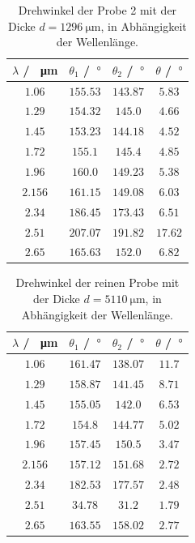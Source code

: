 \begin{table}
  \centering
  \begin{tabular}{c c c c}
    \toprule
    $\lambda$ / \SI{}{\micro\meter}&$\theta_1$ / $\SI{}{\degree}$&$\theta_2$ / $\SI{}{\degree}$&$\theta$ / $\SI{}{\degree}$ \\
    \midrule
    $\num{1.06} $&$\num{155.53}$&$\num{143.87}$&$\num{5.83}$\\
    $\num{1.29} $&$\num{154.32}$&$\num{145.0}$&$\num{4.66}$\\
    $\num{1.45} $&$\num{153.23}$&$\num{144.18}$&$\num{4.52}$\\
    $\num{1.72} $&$\num{155.1}$&$\num{145.4}$&$\num{4.85}$\\
    $\num{1.96} $&$\num{160.0}$&$\num{149.23}$&$\num{5.38}$\\
    $\num{2.156}$&$\num{161.15}$&$\num{149.08}$&$\num{6.03}$\\
    $\num{2.34} $&$\num{186.45}$&$\num{173.43}$&$\num{6.51}$\\
    $\num{2.51} $&$\num{207.07}$&$\num{191.82}$&$\num{17.62}$\\
    $\num{2.65} $&$\num{165.63}$&$\num{152.0}$&$\num{6.82}$\\
    \bottomrule
  \end{tabular}
  \caption{Drehwinkel der Probe 2 mit der Dicke $d=\SI{1296}{\micro\meter}$, in Abhängigkeit der Wellenlänge.}
  \label{tab:Drehwinkel_2}
\end{table}

\begin{table}
  \centering
  \begin{tabular}{c c c c}
    \toprule
    $\lambda$ / \SI{}{\micro\meter}&$\theta_1$ / $\SI{}{\degree}$&$\theta_2$ / $\SI{}{\degree}$&$\theta$ / $\SI{}{\degree}$ \\
    \midrule
    $\num{1.06} $&$\num{161.47}$&$\num{138.07}$&$\num{11.7}$\\
    $\num{1.29} $&$\num{158.87}$&$\num{141.45}$&$\num{8.71}$\\
    $\num{1.45} $&$\num{155.05}$&$\num{142.0}$&$\num{6.53}$\\
    $\num{1.72} $&$\num{154.8}$&$\num{144.77}$&$\num{5.02}$\\
    $\num{1.96} $&$\num{157.45}$&$\num{150.5}$&$\num{3.47}$\\
    $\num{2.156}$&$\num{157.12}$&$\num{151.68}$&$\num{2.72}$\\
    $\num{2.34} $&$\num{182.53}$&$\num{177.57}$&$\num{2.48}$\\
    $\num{2.51} $&$\num{34.78}$&$\num{31.2}$&$\num{1.79}$\\
    $\num{2.65} $&$\num{163.55}$&$\num{158.02}$&$\num{2.77}$\\
    \bottomrule
  \end{tabular}
  \caption{Drehwinkel der reinen Probe mit der Dicke $d=\SI{5110}{\micro\meter}$, in Abhängigkeit der Wellenlänge.}
  \label{tab:Drehwinkel_3}
\end{table}

